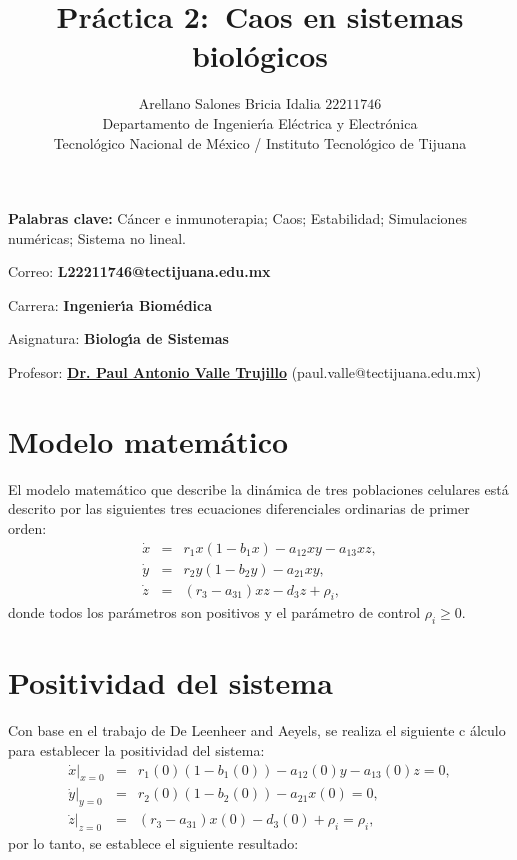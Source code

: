 \documentclass[letterpaper,11pt]{article}
\begin{document}
\title{Pr\'{a}ctica 2:\ Caos en sistemas biol\'{o}gicos}
\author{Arellano Salones Bricia Idalia $22211746$ \\
Departamento de Ingenier\'{\i}a El\'{e}ctrica y Electr\'{o}nica\\
Tecnol\'{o}gico Nacional de M\'{e}xico / Instituto Tecnol\'{o}gico de Tijuana%
}
\maketitle

\noindent \textbf{Palabras clave: }C\'{a}ncer e inmunoterapia; Caos;
Estabilidad; Simulaciones num\'{e}ricas; Sistema no lineal.

\noindent

\noindent Correo: \textbf{L22211746@tectijuana.edu.mx}

\noindent \noindent Carrera: \textbf{Ingenier\'{\i}a Biom\'{e}dica }

\noindent Asignatura: \textbf{Biolog\'{\i}a de Sistemas}

\noindent Profesor: \href{https://biomath.xyz/}{\textbf{Dr. Paul Antonio
Valle Trujillo}} (paul.valle@tectijuana.edu.mx)

\section{Modelo matem\'{a}tico}

El modelo matem\'{a}tico que describe la din\'{a}mica de tres poblaciones
celulares est\'{a} descrito por las siguientes tres ecuaciones diferenciales
ordinarias de primer orden:%
\begin{eqnarray}
\dot{x} &=&r_{1}x\left( 1-b_{1}x\right) -a_{12}xy-a_{13}xz,  \label{x} \\
\dot{y} &=&r_{2}y\left( 1-b_{2}y\right) -a_{21}xy,  \label{y} \\
\dot{z} &=&\left( r_{3}-a_{31}\right) xz-d_{3}z+\rho _{i},  \label{z}
\end{eqnarray}%
donde todos los par\'{a}metros son positivos y el par\'{a}metro de control $%
\rho _{i}\geq 0.$

\section{Positividad del sistema}

Con base en el trabajo de De Leenheer and Aeyels, se realiza el siguiente c%
\'{a}lculo para establecer la positividad del sistema: 
\begin{eqnarray*}
\left. \dot{x}\right\vert _{x=0} &=&r_{1}\left( 0\right) \left(
1-b_{1}\left( 0\right) \right) -a_{12}\left( 0\right) y-a_{13}\left(
0\right) z=0, \\
\left. \dot{y}\right\vert _{y=0} &=&r_{2}\left( 0\right) \left(
1-b_{2}\left( 0\right) \right) -a_{21}x\left( 0\right) =0, \\
\left. \dot{z}\right\vert _{z=0} &=&\left( r_{3}-a_{31}\right) x\left(
0\right) -d_{3}\left( 0\right) +\rho _{i}=\rho _{i},
\end{eqnarray*}%
por lo tanto, se establece el siguiente resultado:
\end{document}
